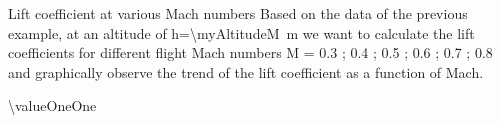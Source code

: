 \documentclass[[12pt,twoside]{book}
\begin{document}
%

%
\begin{myExampleX}{Lift coefficient at various Mach numbers}{}%
\label{example:Lift:Coefficient:At:Various:Mach}
%
\noindent
Based on the data of the previous example, at an altitude of h=\SI[round-precision=0]{\myAltitudeM}{m} we want to calculate the lift coefficients for different flight Mach numbers M = {0.3 ; 0.4  ; 0.5 ; 0.6 ; 0.7 ; 0.8 } and graphically observe the trend of the lift coefficient as a function of Mach.

\myTableDataset

\of{\myTableDataset}
\num[round-precision=2]{\valueOneOne}


\end{myExampleX}
\end{document}
